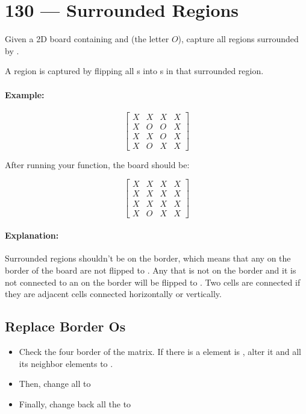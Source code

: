 \section{130 --- Surrounded Regions}
Given a 2D board containing  and  (the letter $O$), capture all regions surrounded by .

A region is captured by flipping all s into s in that surrounded region.

\paragraph{Example:}

\begin{flushleft}


\[
\begin{bmatrix}
X & X & X & X\\
X & O & O & X\\
X & X & O & X\\
X & O & X & X
\end{bmatrix}
\]

After running your function, the board should be:

\[
\begin{bmatrix}
X & X & X & X\\
X & X & X & X\\
X & X & X & X\\
X & O & X & X
\end{bmatrix}
\]



\paragraph{Explanation:}

Surrounded regions shouldn't be on the border, which means that any  on the border of the board are not flipped to . Any  that is not on the border and it is not connected to an  on the border will be flipped to . Two cells are connected if they are adjacent cells connected horizontally or vertically.

\end{flushleft}


\subsection{Replace Border Os}
\begin{itemize}
\item Check the four border of the matrix. If there is a element is , alter it and all its neighbor  elements to .
\item Then, change all  to 
\item Finally, change back all the  to 
\end{itemize}

